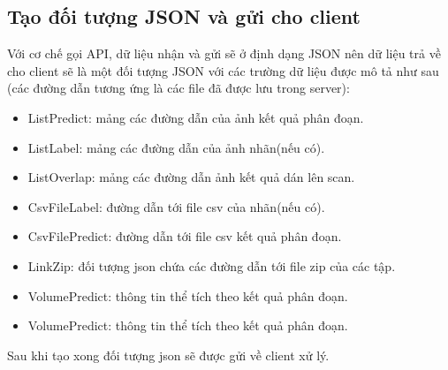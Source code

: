 \subsection{Tạo đối tượng JSON và gửi cho client}
Với cơ chế gọi API, dữ liệu nhận và gửi sẽ ở định dạng JSON nên dữ liệu trả về cho client sẽ là một đối tượng JSON với các trường dữ liệu được mô tả như sau (các đường dẫn tương ứng là các file đã được lưu trong server):
\begin{itemize}
    \item ListPredict: mảng các đường dẫn của ảnh kết quả phân đoạn.
    \item ListLabel: mảng các đường dẫn của ảnh nhãn(nếu có).
    \item ListOverlap: mảng các đường dẫn ảnh kết quả dán lên scan.
    \item CsvFileLabel: đường dẫn tới file csv của nhãn(nếu có).
    \item CsvFilePredict: đường dẫn tới file csv kết quả phân đoạn.
    \item LinkZip: đối tượng json chứa các đường dẫn tới file zip của các tập.
    \item VolumePredict: thông tin thể tích theo kết quả phân đoạn.
    \item VolumePredict: thông tin thể tích theo kết quả phân đoạn.
\end{itemize}
Sau khi tạo xong đối tượng json sẽ được gửi về client xử lý.

